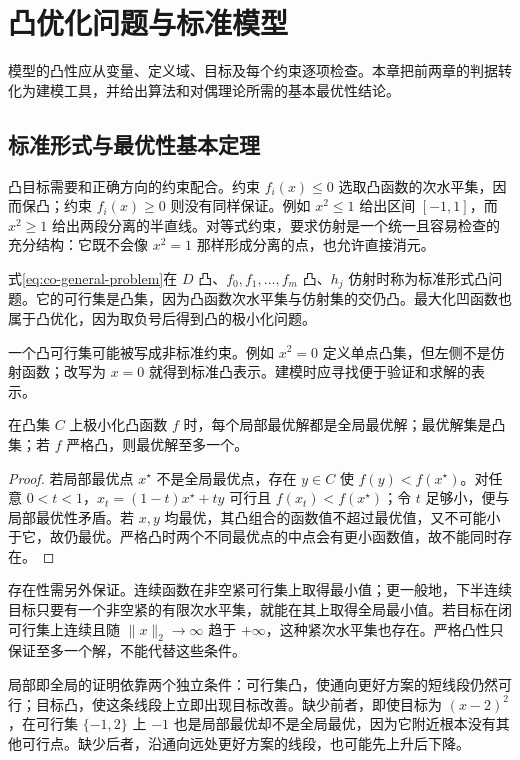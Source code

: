 \documentclass[UTF8,12pt,a4paper,fontset=fandol]{ctexbook}
\begin{document}
\chapter{凸优化问题与标准模型}
\label{ch:co-models}

模型的凸性应从变量、定义域、目标及每个约束逐项检查。本章把前两章的判据转化为建模工具，并给出算法和对偶理论所需的基本最优性结论。

\section{标准形式与最优性基本定理}

凸目标需要和正确方向的约束配合。约束 $f_i(x)\leq0$ 选取凸函数的次水平集，因而保凸；约束 $f_i(x)\geq0$ 则没有同样保证。例如 $x^2\leq1$ 给出区间 $[-1,1]$，而 $x^2\geq1$ 给出两段分离的半直线。对等式约束，要求仿射是一个统一且容易检查的充分结构：它既不会像 $x^2=1$ 那样形成分离的点，也允许直接消元。

式\eqref{eq:co-general-problem}在 $D$ 凸、$f_0,f_1,\ldots,f_m$ 凸、$h_j$ 仿射时称为标准形式凸问题。它的可行集是凸集，因为凸函数次水平集与仿射集的交仍凸。最大化凹函数也属于凸优化，因为取负号后得到凸的极小化问题。

一个凸可行集可能被写成非标准约束。例如 $x^2=0$ 定义单点凸集，但左侧不是仿射函数；改写为 $x=0$ 就得到标准凸表示。建模时应寻找便于验证和求解的表示。

\begin{theorem}[凸问题的最优解]
在凸集 $C$ 上极小化凸函数 $f$ 时，每个局部最优解都是全局最优解；最优解集是凸集；若 $f$ 严格凸，则最优解至多一个。
\end{theorem}
\begin{proof}
若局部最优点 $x^\star$ 不是全局最优点，存在 $y\in C$ 使 $f(y)<f(x^\star)$。对任意 $0<t<1$，$x_t=(1-t)x^\star+ty$ 可行且 $f(x_t)<f(x^\star)$；令 $t$ 足够小，便与局部最优性矛盾。若 $x,y$ 均最优，其凸组合的函数值不超过最优值，又不可能小于它，故仍最优。严格凸时两个不同最优点的中点会有更小函数值，故不能同时存在。
\end{proof}

存在性需另外保证。连续函数在非空紧可行集上取得最小值；更一般地，下半连续目标只要有一个非空紧的有限次水平集，就能在其上取得全局最小值。若目标在闭可行集上连续且随 $\|x\|_2\to\infty$ 趋于 $+\infty$，这种紧次水平集也存在。严格凸性只保证至多一个解，不能代替这些条件。

局部即全局的证明依靠两个独立条件：可行集凸，使通向更好方案的短线段仍然可行；目标凸，使这条线段上立即出现目标改善。缺少前者，即使目标为 $(x-2)^2$，在可行集 $\{-1,2\}$ 上 $-1$ 也是局部最优却不是全局最优，因为它附近根本没有其他可行点。缺少后者，沿通向远处更好方案的线段，也可能先上升后下降。
\end{document}

